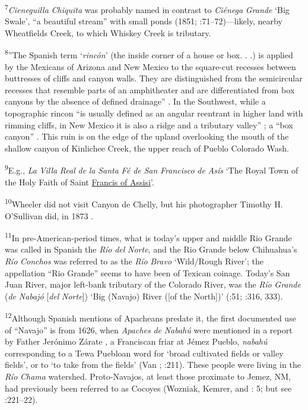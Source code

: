 \textsuperscript{7}\textit{Cieneguilla} \textit{Chiquita} was probably named in contrast to \textit{Ciénega} \textit{Grande} ‘Big Swale’, “a beautiful stream” with small ponds (1851; \citealt{Rice1970}:71–72)—likely, nearby Wheatfields Creek, to which Whiskey Creek is tributary.  

\textsuperscript{8}”The Spanish term ‘\textit{rincón}’ (the inside corner of a house or box. . .) is applied by the Mexicans of Arizona and New Mexico to the square-cut recesses between buttresses of cliffs and canyon walls.  They are distinguished from the semicircular recesses that resemble parts of an amphitheater and are differentiated from box canyons by the absence of defined drainage” \citep[132]{Gregory1917}.  In the Southwest, while a topographic rincon “is usually defined as an angular reentrant in higher land with rimming cliffs, in New Mexico it is also a ridge and a tributary valley” \citep[230]{Burrill1956}; a “box canyon” \citep[74]{Studerus2001}.  This ruin is on the edge of the upland overlooking the mouth of the shallow canyon of Kinlichee Creek, the upper reach of Pueblo Colorado Wash.  

\textsuperscript{9}E.g., \textit{La} \textit{Villa} \textit{Real} \textit{de} \textit{la} \textit{Santa} \textit{Fé} \textit{de} \textit{San} \textit{Francisco} \textit{de} \textit{Asís} ‘The Royal Town of the Holy Faith of Saint \href{https://en.wikipedia.org/wiki/Francis_of_Assisi}{Francis of Assisi}’.

\textsuperscript{10}Wheeler did not visit Canyon de Chelly, but his photographer Timothy H. O’Sullivan did, in 1873 \citep{JurovicsEtAl2010}.

\textsuperscript{11}In pre-American-period times, what is today’s upper and middle Rio Grande was called in Spanish the \textit{Río} \textit{del} \textit{Norte}, and the Rio Grande below Chihuahua’s \textit{Río} \textit{Conchos} was referred to as the \textit{Río} \textit{Bravo} ‘Wild/Rough River’; the appellation “Rio Grande” seems to have been of Texican coinage.  Today’s San Juan River, major left-bank tributary of the Colorado River, was the \textit{Río} \textit{Grande} (\textit{de} \textit{Nabajó} [\textit{del} \textit{Norte}]) ‘Big (Navajo) River ([of the North])’ (\citealt{Briggs1976}:51; \citealt{Julyan1998}:316, 333).

\textsuperscript{12}Although Spanish mentions of Apacheans predate it, the first documented use of “Navajo” is from 1626, when \textit{Apaches} \textit{de} \textit{Nabahú} were mentioned in a report by Father Jerónimo Zárate \citet{Salmerón1966}, a Franciscan friar at Jémez Pueblo, \textit{nabahú} corresponding to a Tewa Puebloan word for ‘broad cultivated fields or valley fields’, or to ‘to take from the fields’ (Van \citealt{Valkenburgh1937}; \citealt{Spicer1962}:211).  These people were living in the \textit{Río} \textit{Chama} watershed.  Proto-Navajos, at least those proximate to Jemez, NM, had previously been referred to as Cocoyes (Wozniak, Kemrer, and \citealt{Carillo1992}: 5; but see \citealt{Schaafsma2002}:221–22).


